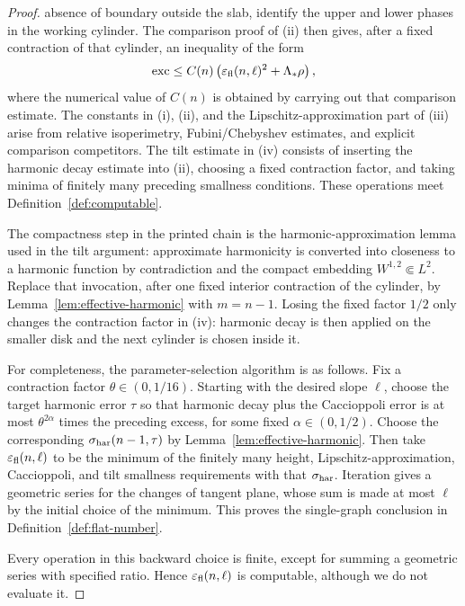 \documentclass[11pt]{amsart}
\theoremstyle{definition}
\begin{document}
\begin{proof}
absence of boundary outside the slab, identify the upper and lower
phases in the working cylinder.  The comparison proof of (ii) then gives,
after a fixed contraction of that cylinder, an inequality of the form
\[
   \operatorname{exc}
      \le C(n)\left(\varepsilon_{\rm fl}(n,\ell)^2
                    +\Lambda_*\rho\right),
\]
where the numerical value of \(C(n)\) is obtained by carrying out that
comparison estimate.  The constants in (i), (ii), and the
Lipschitz-approximation part of (iii) arise from relative isoperimetry,
Fubini/Chebyshev estimates, and explicit comparison competitors.  The
tilt estimate in (iv) consists
of inserting the harmonic decay estimate into (ii), choosing a fixed
contraction factor, and taking minima of finitely many preceding
smallness conditions.  These operations meet
Definition~\ref{def:computable}.

The compactness step in the printed chain is the harmonic-approximation
lemma used in the tilt argument: approximate harmonicity is converted
into closeness to a harmonic function by contradiction and the compact
embedding \(W^{1,2}\Subset L^2\).  Replace that invocation, after one
fixed interior contraction of the cylinder, by
Lemma~\ref{lem:effective-harmonic} with \(m=n-1\).  Losing the fixed
factor \(1/2\) only changes the contraction factor in (iv): harmonic
decay is then applied on the smaller disk and the next cylinder is
chosen inside it.

For completeness, the parameter-selection algorithm is as follows.
Fix a contraction factor \(\theta\in(0,1/16)\).  Starting with the
desired slope \(\ell\), choose the target harmonic error \(\tau\) so
that harmonic decay plus the Caccioppoli error is at most
\(\theta^{2\alpha}\) times the preceding excess, for some fixed
\(\alpha\in(0,1/2)\).  Choose the corresponding
\(\sigma_{\rm har}(n-1,\tau)\) by Lemma~\ref{lem:effective-harmonic}.
Then take \(\varepsilon_{\rm fl}(n,\ell)\) to be the minimum of the
finitely many height, Lipschitz-approximation, Caccioppoli, and tilt
smallness requirements with that \(\sigma_{\rm har}\).  Iteration gives
a geometric series for the changes of tangent plane, whose sum is made
at most \(\ell\) by the initial choice of the minimum.  This proves the
single-graph conclusion in Definition~\ref{def:flat-number}.

Every operation in this backward choice is finite, except for summing a
geometric series with specified ratio.  Hence
\(\varepsilon_{\rm fl}(n,\ell)\) is computable, although we do not
evaluate it.
\end{proof}
\end{document}
